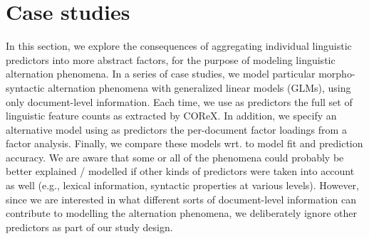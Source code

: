 \section{Case studies}
\label{sec:case-studies}
In this section, we explore the consequences of aggregating individual linguistic predictors into more abstract factors, for the purpose of modeling linguistic alternation phenomena. In a series of case studies, we model particular morpho-syntactic alternation phenomena with generalized linear models (GLMs), using only document-level information. Each time, we use as predictors the full set of linguistic feature counts as extracted by COReX. In addition, we specify an alternative model using as predictors the per-document factor loadings from a factor analysis. Finally, we compare these models wrt. to model fit and prediction accuracy. 
We are aware that some or all of the phenomena could probably be better explained / modelled if other kinds of predictors were taken into account as well (e.g., lexical information, syntactic properties at various levels). However, since we are interested in what different sorts of document-level information can contribute to modelling the alternation phenomena, we deliberately ignore other predictors as part of our study design.

